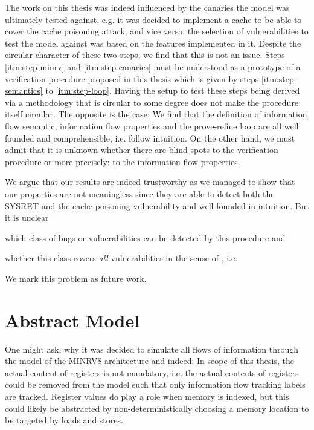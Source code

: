 The work on this thesis was indeed influenced by the canaries the model was ultimately tested against, e.g. it was decided to implement a cache to be able to cover the cache poisoning attack, and vice versa: the selection of vulnerabilities to test the model against was based on the features implemented in it.
Despite the circular character of these two steps, we find that this is not an issue.
Steps \ref{itm:step-minrv} and \ref{itm:step-canaries} must be understood as a prototype of a verification procedure proposed in this thesis which is given by steps \ref{itm:step-semantics} to \ref{itm:step-loop}.
Having the setup to test these steps being derived via a methodology that is circular to some degree does not make the procedure itself circular.
The opposite is the case:
We find that the definition of information flow semantic, information flow properties and the prove-refine loop are all well founded and comprehensible, i.e. follow intuition.
On the other hand, we must admit that it is unknown whether there are blind spots to the verification procedure or more precisely: to the information flow properties.

We argue that our results are indeed trustworthy as we managed to show that our properties are not meaningless since they are able to detect both the SYSRET and the cache poisoning vulnerability and well founded in intuition.
But it is unclear
\begin{enumerate*}[label=\alph*)]
    \item which class of bugs or vulnerabilities can be detected by this procedure and
    \item whether this class covers \textit{all} vulnerabilities in the sense of \citeauthor{Piano}, i.e. 
\end{enumerate*}
We mark this problem as future work.

\section{Abstract Model}

One might ask, why it was decided to simulate all flows of information through the model of the MINRV8 architecture and indeed: In scope of this thesis, the actual content of registers is not mandatory, i.e. the actual contents of registers could be removed from the model such that only information flow tracking labels are tracked.
Register values do play a role when memory is indexed, but this could likely be abstracted by non-deterministically choosing a memory location to be targeted by loads and stores.

